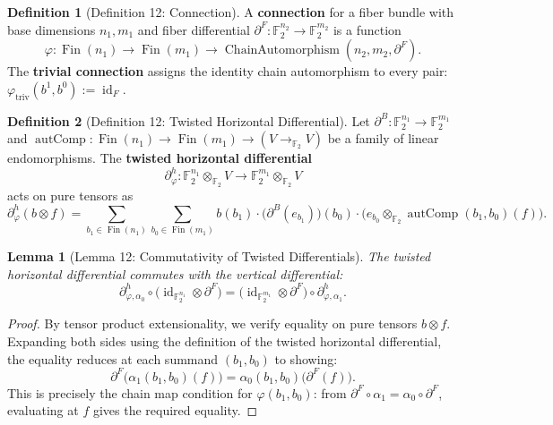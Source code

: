 \documentclass[11pt]{article}
\theoremstyle{plain}
\newtheorem*{lemma}{Lemma}
\theoremstyle{definition}
\newtheorem*{definition}{Definition}
\theoremstyle{remark}
\begin{document}
\begin{definition}[Definition 12: Connection]
A \textbf{connection} for a fiber bundle with base dimensions $n_1, m_1$ and fiber differential $\partial^F : \mathbb{F}_2^{n_2} \to \mathbb{F}_2^{m_2}$ is a function
\[
  \varphi : \operatorname{Fin}(n_1) \to \operatorname{Fin}(m_1) \to \operatorname{ChainAutomorphism}(n_2, m_2, \partial^F).
\]
The \textbf{trivial connection} assigns the identity chain automorphism to every pair: $\varphi_{\operatorname{triv}}(b^1, b^0) := \operatorname{id}_F$.
\end{definition}

\begin{definition}[Definition 12: Twisted Horizontal Differential]
Let $\partial^B : \mathbb{F}_2^{n_1} \to \mathbb{F}_2^{m_1}$ and $\operatorname{autComp} : \operatorname{Fin}(n_1) \to \operatorname{Fin}(m_1) \to (V \to_{\mathbb{F}_2} V)$ be a family of linear endomorphisms. The \textbf{twisted horizontal differential}
\[
  \partial^h_\varphi : \mathbb{F}_2^{n_1} \otimes_{\mathbb{F}_2} V \longrightarrow \mathbb{F}_2^{m_1} \otimes_{\mathbb{F}_2} V
\]
acts on pure tensors as
\[
  \partial^h_\varphi(b \otimes f) = \sum_{b_1 \in \operatorname{Fin}(n_1)} \sum_{b_0 \in \operatorname{Fin}(m_1)} b(b_1) \cdot \bigl(\partial^B(e_{b_1})\bigr)(b_0) \cdot \bigl(e_{b_0} \otimes_{\mathbb{F}_2} \operatorname{autComp}(b_1, b_0)(f)\bigr).
\]
\end{definition}

\begin{lemma}[Lemma 12: Commutativity of Twisted Differentials]
The twisted horizontal differential commutes with the vertical differential:
\[
  \partial^h_{\varphi,\alpha_0} \circ \bigl(\operatorname{id}_{\mathbb{F}_2^{n_1}} \otimes \partial^F\bigr) = \bigl(\operatorname{id}_{\mathbb{F}_2^{m_1}} \otimes \partial^F\bigr) \circ \partial^h_{\varphi,\alpha_1}.
\]
\end{lemma}

\begin{proof}
By tensor product extensionality, we verify equality on pure tensors $b \otimes f$. Expanding both sides using the definition of the twisted horizontal differential, the equality reduces at each summand $(b_1, b_0)$ to showing:
\[
  \partial^F\bigl(\alpha_1(b_1,b_0)(f)\bigr) = \alpha_0(b_1,b_0)\bigl(\partial^F(f)\bigr).
\]
This is precisely the chain map condition for $\varphi(b_1, b_0)$: from $\partial^F \circ \alpha_1 = \alpha_0 \circ \partial^F$, evaluating at $f$ gives the required equality.
\end{proof}
\end{document}
